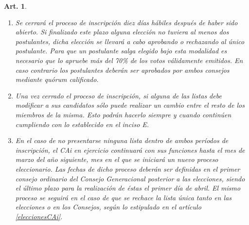 \documentclass[letterpaper,11pt]{article}
\theoremstyle{plain}
\newtheorem{art}{Art.} %
\begin{document}
\begin{art}
\begin{enumerate}
\begin{enumerate}
						\item En el caso de los candidatos a Consejero Académico:
							\begin{enumerate}
								\item El nombre del candidato, el cual debe haber aprobado el proceso de preinscripción.
								\item\label{foto} Una foto (mín. $500 \times 500$ pixeles).
								\item Un plan de trabajo y propuestas para su período.
							\end{enumerate}

						\item En el caso de los candidatos a Consejero de Postgrado:
							\begin{enumerate}
								\item El nombre del candidato, el cual debe haber aprobado el proceso de preinscripción.
								\item\label{foto} Una foto (mín. $500 \times 500$ pixeles).
								\item Un plan de trabajo que detalle los lineamientos, objetivos y propuestas para su período.
							\end{enumerate}
					\end{enumerate}

				\item\label{cierre}Se cerrará el proceso de inscripción diez días hábiles después de haber sido abierto. Si finalizado este plazo alguna elección no tuviera al menos dos postulantes, dicha elección se llevará a cabo aprobando o rechazando al único postulante. Para que un postulante salga elegido bajo esta modalidad es necesario que lo apruebe más del 70\% de los votos válidamente emitidos. En caso contrario los postulantes deberán ser aprobados por ambos consejos mediante quórum calificado.
				
				\item Una vez cerrado el proceso de inscripción, si alguna de las listas debe modificar a sus candidatos sólo puede realizar un cambio entre el resto de los miembros de la misma. Esto podrán hacerlo siempre y cuando continúen cumpliendo con lo establecido en el inciso E.
				
				\item En el caso de no presentarse ninguna lista dentro de ambos períodos de inscripción, el CAi en ejercicio continuará con sus funciones hasta el mes de marzo del año siguiente, mes en el que se iniciará un nuevo proceso eleccionario. Las fechas de dicho proceso deberán ser definidas en  el primer consejo ordinario del Consejo Generacional posterior a las elecciones, siendo el último plazo para la realización de éstas el primer día de abril. El mismo proceso se seguirá en el caso de que se rechace la lista única tanto en las elecciones o en los Consejos, según lo estipulado en el artículo \ref{eleccionesCAi}.
				

\end{enumerate}
\end{art}
\end{document}
